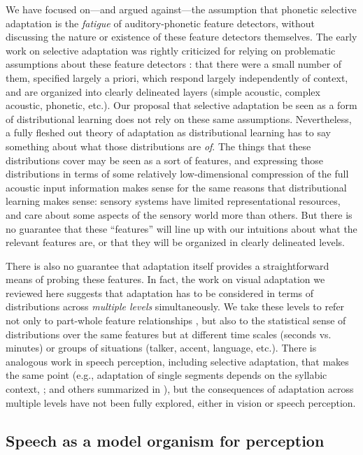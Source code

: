 We have focused on---and argued against---the assumption that phonetic selective adaptation is the \emph{fatigue} of auditory-phonetic feature detectors, without discussing the nature or existence of these feature detectors themselves.  The early work on selective adaptation was rightly criticized for relying on problematic assumptions about these feature detectors \cite{Remez1987}: that there were a small number of them, specified largely a priori, which respond largely independently of context, and are organized into clearly delineated layers (simple acoustic, complex acoustic, phonetic, etc.).  Our proposal that selective adaptation be seen as a form of distributional learning does not rely on these same assumptions.  Nevertheless, a fully fleshed out theory of adaptation as distributional learning has to say something about what those distributions are \emph{of}.  The things that these distributions cover may be seen as a sort of features, and expressing those distributions in terms of some relatively low-dimensional compression of the full acoustic input information makes sense for the same reasons that distributional learning makes sense: sensory systems have limited representational resources, and care about some aspects of the sensory world more than others.  But there is no guarantee that these ``features'' will line up with our intuitions about what the relevant features are, or that they will be organized in clearly delineated levels.  

There is also no guarantee that adaptation itself provides a straightforward means of probing these features.  In fact, the work on visual adaptation we reviewed here suggests that adaptation has to be considered in terms of distributions across \emph{multiple levels} simultaneously.  We take these levels to refer not only to part-whole feature relationships \cite{He2012}, but also to the statistical sense of distributions over the same features but at different time scales (seconds vs. minutes) \cite{Chopin2012} or groups of situations (talker, accent, language, etc.). There is analogous work in speech perception, including selective adaptation, that makes the same point (e.g., adaptation of single segments depends on the syllabic context, ; and others summarized in ), but the consequences of adaptation across multiple levels have not been fully explored, either in vision or speech perception.


\subsection{Speech as a model organism for perception}
\label{sec:speech-as-model}


